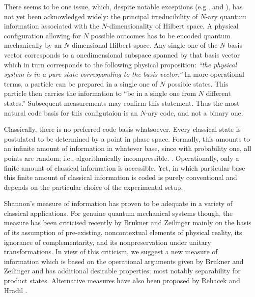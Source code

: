There seems to be one issue,
which, despite notable exceptions (e.g., \cite[Footnote 6]{zeil-99} and
\cite{Muthukrishnan}),
has not yet been acknowledged widely:
the principal irreducibility of $N$-ary quantum information
associated with the $N$-dimensionality of Hilbert space.
A physical configuration allowing for $N$ possible outcomes
has to be encoded quantum mechanically by an $N$-dimensional Hilbert space.
Any single one of the $N$ basis vector corresponds
to a onedimensional subspace spanned by that basis vector
which in turn corresponds to the following physical proposition:
{\em ``the physical system is in a pure state corresponding to the basis vector.''}
In more operational terms, a particle can be prepared
in a single one of $N$ possible states.
This particle then carries the information to
``be in a single one from $N$ different states.''
Subsequent measurements may confirm this statement.
Thus the most natural code basis for this configutaion is an $N$-ary code,
and not a binary one.


Classically, there is no preferred code basis whatsoever.
Every classical state is postulated to be determined by a
point in phase space.
Formally, this amounts to an infinite amount of information in whatever base,
since
with probability one, all points are random; i.e., algorithmically incompressible.
\cite{chaitin2,calude:94}.
Operationally, only a finite amount of classical information is accessible.
Yet, in which particular base this finite amount of classical information is coded
is purely conventional and depends on the particular choice of the experimental setup.



Shannon's measure of information has proven to be adequate in a variety of classical applications.
For genuine quantum mechanical systems though, the measure has been criticised recently
by Brukner and Zeilinger \cite{zeil-bruk-01}
mainly on the basis of its assumption of pre-existing, noncontextual elements
of physical reality, its ignorance of complementarity,
and its nonpreservation under unitary transformations.
In view of this criticism, we suggest a new measure of information which is based
on the operational arguments given by Brukner and Zeilinger  \cite{zeil-bruk-99a,zeil-bruk-01}
and has additional desirable properties; most notably separability for
product states.
Alternative measures have also been proposed by Rehacek and Hradil \cite{Reha-Hradil}.

